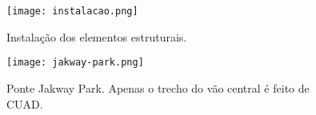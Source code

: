 \begin{figure}[htb]
	\caption{\label{instalacao}Instalação dos elementos estruturais.}
	\begin{center}
		\texttt{[image: instalacao.png]}
	\end{center}
\end{figure}

\begin{figure}[htb]
	\caption{\label{jakway-park}Ponte Jakway Park. Apenas o trecho do vão central é feito de CUAD.}
	\begin{center}
		\texttt{[image: jakway-park.png]}
	\end{center}
\end{figure}